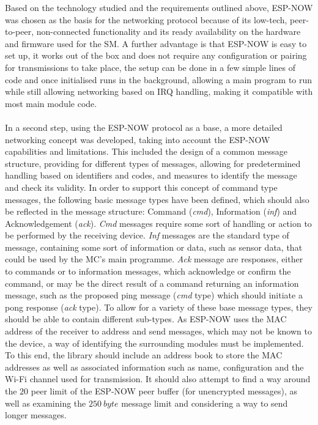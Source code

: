 Based on the technology studied and the requirements outlined above, ESP-NOW was chosen as the basis for the networking protocol because of its low-tech, peer-to-peer, non-connected functionality and its ready availability on the hardware and firmware used for the SM. A further advantage is that ESP-NOW is easy to set up, it works out of the box and does not require any configuration or pairing for transmissions to take place, the setup can be done in a few simple lines of code and once initialised runs in the background, allowing a main program to run while still allowing networking based on IRQ handling, making it compatible with most main module code.\\\\
In a second step, using the ESP-NOW protocol as a base, a more detailed networking concept was developed, taking into account the ESP-NOW capabilities and limitations. This included the design of a common message structure, providing for different types of messages, allowing for predetermined handling based on identifiers and codes, and measures to identify the message and check its validity. In order to support this concept of command type messages, the following basic message types have been defined, which should also be reflected in the message structure: Command (\textit{cmd}), Information (\textit{inf}) and Acknowledgement (\textit{ack}).
\textit{Cmd} messages require some sort of handling or action to be performed by the receiving device. 
\textit{Inf} messages are the standard type of message, containing some sort of information or data, such as sensor data, that could be used by the MC's main programme. \textit{Ack} message are responses, either to commands or to information messages, which acknowledge or confirm the command, or may be the direct result of a command returning an information message, such as the proposed ping message (\textit{cmd} type) which should initiate a pong response (\textit{ack} type). To allow for a variety of these base message types, they should be able to contain different sub-types.
As ESP-NOW uses the MAC address of the receiver to address and send messages, which may not be known to the device, a way of identifying the surrounding modules must be implemented. To this end, the library should include an address book to store the MAC addresses as well as associated information such as name, configuration and the Wi-Fi channel used for transmission. 
It should also attempt to find a way around the $20$ peer limit of the ESP-NOW peer buffer (for unencrypted messages), as well as examining the $250\ byte$ message limit and considering a way to send longer messages.
